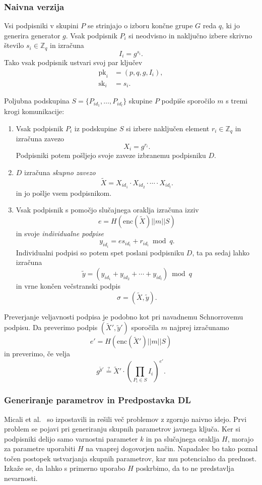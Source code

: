 \documentclass[isrm2, tisk]{fmfdelo}
\newcommand{\Z}{\mathbb Z}
\begin{document}
\subsubsection{Naivna verzija}
Vsi podpisniki v skupini $P$ se strinjajo o izboru končne grupe $G$ reda $q$, ki jo generira generator
$g$. Vsak podpisnik $P_i$ si neodvisno in naključno izbere skrivno število $s_i \in \Z_q$ in izračuna 
$$
I_i = g^{s_i}.
$$
Tako vsak podpisnik ustvari svoj par ključev
\begin{align*}
    \text{pk}_i &= (p, q, g, I_i), \\
    \text{sk}_i &= s_i.
\end{align*}

Poljubna podskupina $S =\{P_{id_1}, \dots, P_{id_l}\}$ skupine $P$ podpiše sporočilo $m$ s tremi 
krogi komunikacije:
\begin{enumerate}
    \item Vsak podpisnik $P_i$ iz podskupine $S$ si izbere naključen element $r_i \in \Z_q$
        in izračuna zavezo
        $$
        X_i = g^{r_i}.
        $$
        Podpisniki potem pošljejo svoje zaveze izbranemu podpisniku $D$. 
    \item $D$ izračuna \textit{skupno zavezo} 
        $$ 
        \tilde{X} = X_{id_1} \cdot X_{id_2} \cdot \cdots \cdot X_{id_l}.
        $$
        in jo pošlje vsem podpisnikom.
    \item Vsak podpisnik s pomočjo slučajnega oraklja izračuna izziv 
        $$ 
        e = H(\text{enc}(\tilde{X}) || m || S)
        $$
        in svoje \textit{individualne podpise} 
        $$ 
        y_{id_i} = e s_{id_i} + r_{id_i} \bmod q.
        $$
        Individualni podpisi so potem spet poslani podpisniku $D$, ta pa sedaj lahko 
        izračuna 
        $$ 
        \tilde{y} = (y_{id_1} + y_{id_2} + \cdots + y_{id_l}) \bmod q 
        $$
        in vrne končen večstranski podpis
        $$ 
        \sigma = (\tilde{X}, \tilde{y}).
        $$
\end{enumerate}

Preverjanje veljavnosti podpisa je podobno kot pri navadnemu Schnorrovemu podpisu. Da preverimo 
podpis $(\tilde{X}', \tilde{y}')$ sporočila $m$ najprej izračunamo 
$$
e' = H(\text{enc}(\tilde{X}') || m || S)
$$
in preverimo, če velja
\begin{equation}
\label{eq:naive-ver}
g^{\tilde{y}'} \stackrel{?}{=} \tilde{X}' \cdot \left(\prod_{P_i \in S} I_i \right)^{e'}.
\end{equation}

\subsubsection{Generiranje parametrov in Predpostavka DL}
Micali et al.~\cite{micali2001asm} so izpostavili in rešili več problemov z zgornjo naivno idejo.
Prvi problem se pojavi pri generiranju skupnih parametrov javnega ključa. Ker si podpisniki
delijo samo varnostni parameter $k$ in pa slučajnega oraklja $H$, morajo za parametre uporabiti
$H$ na vnaprej dogovorjen način. Napadalec bo tako poznal točen postopek ustvarjanja skupnih
parametrov, kar mu potencialno da prednost. Izkaže se, da lahko s primerno uporabo $H$ poskrbimo,
da to ne predstavlja nevarnosti.
\end{document}
